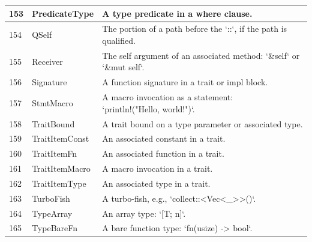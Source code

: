 \begin{longtable}{| p{} | p{} | p{} |}
153   & PredicateType                  & A type predicate in a where clause.                                                                            \\ \hline
154   & QSelf                          & The portion of a path before the `::`, if the path is qualified.                                               \\ \hline
155   & Receiver                       & The self argument of an associated method: `\&self` or `\&mut self`.                                             \\ \hline
156   & Signature                      & A function signature in a trait or impl block.                                                                 \\ \hline
157   & StmtMacro                      & \makecell{A macro invocation as a statement: \\ `println!("Hello, world!")`.}                                                \\ \hline
158   & TraitBound                     & A trait bound on a type parameter or associated type.                                                          \\ \hline
159   & TraitItemConst                 & An associated constant in a trait.                                                                             \\ \hline
160   & TraitItemFn                    & An associated function in a trait.                                                                             \\ \hline
161   & TraitItemMacro                 & A macro invocation in a trait.                                                                                 \\ \hline
162   & TraitItemType                  & An associated type in a trait.                                                                                 \\ \hline
163   & TurboFish                      & A turbo-fish, e.g., `collect::<Vec<\_>>()`.                                                                     \\ \hline
164   & TypeArray                      & An array type: `[T; n]`.                                                                                       \\ \hline
165   & TypeBareFn                     & A bare function type: `fn(usize) -> bool`.                                                                     \\ \hline

\end{longtable}
